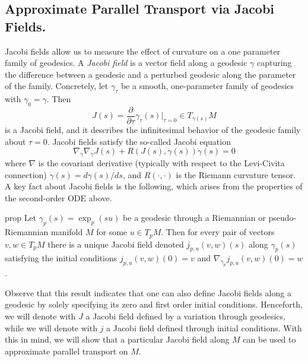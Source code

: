 \documentclass[11pt]{article}
\newcommand{\man}{M}
\begin{document}
\subsection{Approximate Parallel Transport via Jacobi Fields.} 

Jacobi fields allow us to measure the effect of curvature on a one parameter family of geodesics. A \textit{Jacobi field} is a vector field along a geodesic $\gamma$ capturing the difference between a geodesic and a perturbed geodesic along the parameter of the family. Concretely, let $\gamma_{\tau}$ be a smooth, one-parameter family of geodesics with $\gamma_0 = \gamma$. Then
\begin{equation}
    J(s) = \frac{\partial}{\partial \tau}\gamma_{\tau}(s)\bigg|_{\tau = 0} \in T_{\gamma(s)}\man
\end{equation}
is a Jacobi field, and it describes the infinitesimal behavior of the geodesic family about $\tau = 0$. Jacobi fields satisfy the so-called Jacobi equation
\begin{equation}
    \nabla_{\dot\gamma}\nabla_{\dot\gamma}J(s) + R(J(s), \dot{\gamma}(s))\dot{\gamma}(s) = 0
\end{equation}
where $\nabla$ is the covariant derivative (typically with respect to the Levi-Civita connection) $\dot{\gamma}(s) = d\gamma(s)/ds$, and $R(\cdot, \cdot)$ is the Riemann curvature tensor. A key fact about Jacobi fields is the following, which arises from the properties of the second-order ODE above. 

\begin{restatable}{prop}{}
Let $\gamma_p(s) = \exp_p(su)$ be a geodesic through a Riemannian or pseudo-Riemannian manifold $\man$ for some $u \in T_p\man$. Then for every pair of vectors $v, w \in T_p\man$ there is a unique Jacobi field denoted $j_{p, u}(v, w )(s)$ along $\gamma_p(s)$ satisfying the initial conditions $j_{p, u}(v, w )(0) = v$ and $\nabla_{\dot \gamma_p}j_{p, u}(v, w)(0) = w$. 
\end{restatable}

Observe that this result indicates that one can also define Jacobi fields along a geodesic by solely specifying its zero and first order initial conditions. Henceforth, we will denote with $J$ a Jacobi field defined by a variation through geodesics, while we will denote with $j$ a Jacobi field defined through initial conditions. With this in mind, we will show that a particular Jacobi field along $\man$ can be used to approximate parallel transport on $\man$.
\end{document}

